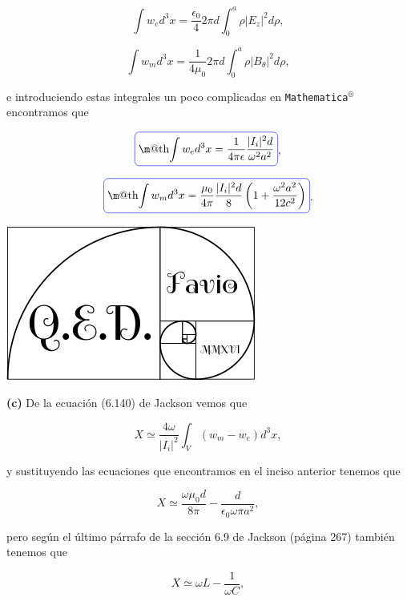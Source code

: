 \documentclass[a4paper,11pt]{article}
\makeatletter
\numberwithin{equation}{section}
\newcommand*{\boxcolor}{blue}
\renewcommand{\boxed}[1]{\textcolor{\boxcolor}{%
\tikz[baseline={([yshift=-1ex]current bounding box.center)}] \node [rectangle, minimum width=1ex,rounded corners,draw] {\normalcolor\m@th$\displaystyle#1$};}}
\makeatother
\begin{document}
\begin{equation}
 \int w_e d^3x = \frac{\epsilon_0}{4}2\pi d \int_0^a \rho |E_z|^2 d\rho,
\end{equation}

\begin{equation}
 \int w_m d^3x = \frac{1}{4\mu_0}2\pi d \int_0^a \rho |B_\theta|^2 d\rho,
\end{equation}

e introduciendo estas integrales un poco complicadas en \texttt{Mathematica$^\circledR$}
encontramos que 

\begin{equation}
 \boxed{\int w_e d^3x = \frac{1}{4\pi\epsilon}\frac{|I_i|^2d}{\omega^2 a^2}},
\end{equation}

\begin{equation}
 \boxed{\int w_m d^3x = \frac{\mu_0}{4\pi}\frac{|I_i|^2d}{8}\left(1 +
\frac{\omega^2 a^2}{12c^2} \right)}.
\end{equation}

\hspace{10cm}\includegraphics[scale=0.25]{logoQED}

\textbf{(c)} De la ecuación (6.140) de Jackson \cite{jackson} vemos que 

\begin{equation}
 X \simeq \frac{4\omega}{|I_i|^2}\int_V (w_m - w_e)d^3x,
\end{equation}

y sustituyendo las ecuaciones que encontramos en el inciso anterior tenemos que 

\begin{equation}
 X \simeq  \frac{\omega \mu_0 d}{8\pi} - \frac{d}{\epsilon_0 \omega \pi a^2},
\end{equation}

pero según el último párrafo de la sección 6.9 de Jackson \cite{jackson} (página 
267) también tenemos que 

\begin{equation}
 X \simeq \omega L - \frac{1}{\omega C},
\end{equation}
\end{document}
